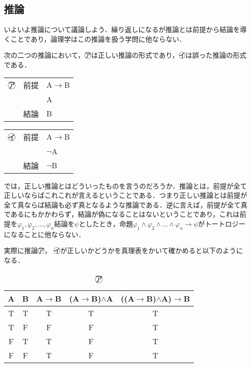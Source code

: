 \documentclass[10pt,b5paper,papersize,dvipdfmx]{jsbook}
\begin{document}
\subsection{推論}
いよいよ推論について議論しよう．繰り返しになるが推論とは前提から結論を導くことであり，論理学はこの推論を扱う学問に他ならない．\par
次の二つの推論において，\textcircled{\scriptsize ア}は正しい推論の形式であり，\textcircled{\scriptsize イ}は誤った推論の形式である．
\begin{table}[H]
\begin{minipage}[t]{.45\textwidth}
\begin{center}
\begin{tabular}{lll}
\textcircled{\scriptsize ア}&前提&A$\to$B \\
&&A \\ \hline
&結論&B \\
\end{tabular}
\end{center}
\end{minipage}
\hfill
\begin{minipage}[t]{.45\textwidth}
\begin{center}
\begin{tabular}{lll}
\textcircled{\scriptsize イ}&前提&A$\to$B \\
&&$\lnot$A \\ \hline
&結論&$\lnot$B \\
\end{tabular}
\end{center}
\end{minipage}
\end{table}
では，正しい推論とはどういったものを言うのだろうか．推論とは，前提が全て正しいならばこれこれが言えるということである．つまり正しい推論とは前提が全て真ならば結論も必ず真となるような推論である．逆に言えば，前提が全て真であるにもかかわらず，結論が偽になることはないということであり，これは前提を$\varphi_1,\varphi_2,\dots,\varphi_n$結論を$\psi$としたとき，命題$\varphi_1\land\varphi_2\land \dots \land\varphi_n\to\psi$がトートロジーになることに他ならない．\par
実際に推論\textcircled{\scriptsize ア}， \textcircled{\scriptsize イ}が正しいかどうかを真理表をかいて確かめると以下のようになる．
\begin{table}[H]
\begin{center}
\caption{\textcircled{\scriptsize ア}}
\begin{tabular}{|c|c||c|c|c|}\hline
A&B&A$\to$B&(A$\to$B)$\land$A&((A$\to$B)$\land$A)$\to$B \\ \hline \hline
T&T&T&T&T \\ \hline
T&F&F&F&T \\ \hline
F&T&T&F&T \\ \hline
F&F&T&F&T \\ \hline
\end{tabular}
\end{center}
\end{table}
\end{document}
